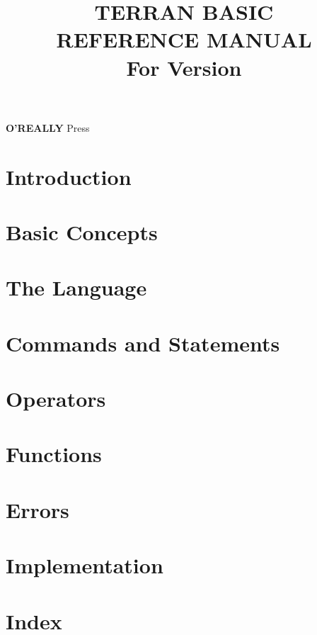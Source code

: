 \documentclass[10pt, stock, openany]{memoir}
\title{\HUGE\textbf{TERRAN BASIC \\ REFERENCE MANUAL} \\ \Large \vspace{1em} For Version \tbasver \\ \vspace{7mm} \theedition}
\date{}
\author{}
\newcommand{\oreallypress}{\large\textbf{O'REALLY\raisebox{1ex}{\scriptsize ?}} \normalsize Press}
\begin{document}
\begin{titlingpage}
\maketitle{}
\vfill
\oreallypress
\end{titlingpage}

\setcounter{page}{3}

\tableofcontents*



\openright
\chapter{Introduction}


\openany
\chapter{Basic Concepts}


\chapter{The Language}


\chapter{Commands and Statements}



\chapter{Operators}



\chapter{Functions}



\chapter{Errors}



\chapter{Implementation}





\chapter{Index}




\afterpage{\pagestyle{empty}\null\newpage}
\end{document}
